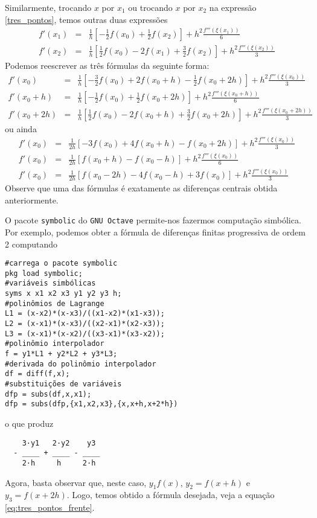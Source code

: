 Similarmente, trocando $x$ por $x_1$ ou trocando $x$ por $x_2$ na expressão \eqref{tres_pontos}, temos outras duas expressões
\begin{eqnarray}
f'(x_1)&=&\frac{1}{h}\left[-\frac{1}{2}f(x_0)
+\frac{1}{2}f(x_{2})\right]+h^2\frac{f'''(\xi(x_1))}{6}\\
f'(x_2)&=&\frac{1}{h}\left[\frac{1}{2}f(x_0)-2f(x_{1})
+\frac{3}{2}f(x_{2})\right]+h^2\frac{f'''(\xi(x_2))}{3}
\end{eqnarray}
Podemos reescrever as três fórmulas da seguinte forma:
\begin{eqnarray}
f'(x_0)&=&\frac{1}{h}\left[-\frac{3}{2}f(x_0)+2f(x_{0}+h)
-\frac{1}{2}f(x_{0}+2h)\right]+h^2\frac{f'''(\xi(x_0))}{3}\\
f'(x_0+h)&=&\frac{1}{h}\left[-\frac{1}{2}f(x_0)
+\frac{1}{2}f(x_{0}+2h)\right]+h^2\frac{f'''(\xi(x_0+h))}{6}\\
f'(x_0+2h)&=&\frac{1}{h}\left[\frac{1}{2}f(x_0)-2f(x_{0}+h)
+\frac{3}{2}f(x_{0}+2h)\right]+h^2\frac{f'''(\xi(x_{0}+2h))}{3}
\end{eqnarray}
ou ainda
\begin{eqnarray}
f'(x_0)&=&\frac{1}{2h}\left[-3f(x_0)+4f(x_{0}+h)
-f(x_{0}+2h)\right]+h^2\frac{f'''(\xi(x_0))}{3}\label{eq:tres_pontos_frente}\\
f'(x_0)&=&\frac{1}{2h}\left[f(x_{0}+h)-f(x_0-h)\right]+h^2\frac{f'''(\xi(x_0))}{6}\label{eq:tres_pontos_central}\\
f'(x_0)&=&\frac{1}{2h}\left[f(x_0-2h)-4f(x_{0}-h)
+3f(x_{0})\right]+h^2\frac{f'''(\xi(x_{0}))}{3}\label{eq:tres_pontos_traz}
\end{eqnarray}
Observe que uma das fórmulas é exatamente as diferenças centrais obtida anteriormente.

\ifisoctave
\begin{obs}
O pacote \verb+symbolic+ do \verb+GNU Octave+ permite-nos fazermos computação simbólica. Por exemplo, podemos obter a fórmula de diferenças finitas progressiva de ordem 2 computando
\begin{verbatim}
#carrega o pacote symbolic
pkg load symbolic;
#variáveis simbólicas
syms x x1 x2 x3 y1 y2 y3 h;
#polinômios de Lagrange
L1 = (x-x2)*(x-x3)/((x1-x2)*(x1-x3));
L2 = (x-x1)*(x-x3)/((x2-x1)*(x2-x3));
L3 = (x-x1)*(x-x2)/((x3-x1)*(x3-x2));
#polinômio interpolador
f = y1*L1 + y2*L2 + y3*L3;
#derivada do polinômio interpolador
df = diff(f,x);
#substituições de variáveis
dfp = subs(df,x,x1);
dfp = subs(dfp,{x1,x2,x3},{x,x+h,x+2*h})
\end{verbatim}
o que produz
\begin{verbatim}
    3·y1   2·y2    y3
  - ____ + ____ - ____
    2·h     h     2·h
\end{verbatim}
Agora, basta observar que, neste caso, $y_1 f(x)$, $y_2 = f(x+h)$ e $y_3 = f(x+2h)$. Logo, temos obtido a fórmula desejada, veja a equação \eqref{eq:tres_pontos_frente}.
\end{obs}
\fi

